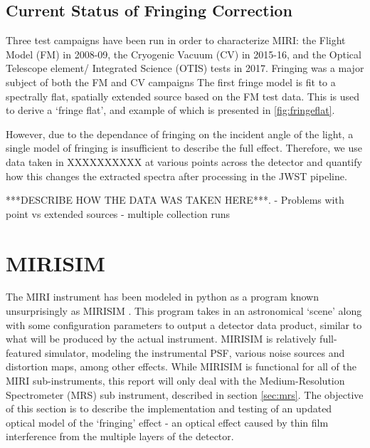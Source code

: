 \subsection{Current Status of Fringing Correction}
Three test campaigns have been run in order to characterize MIRI: the Flight Model (FM) in 2008-09, the Cryogenic Vacuum (CV) in 2015-16, and the Optical Telescope element/ Integrated Science (OTIS) tests in 2017. 
Fringing was a major subject of both the FM and CV campaigns
The first fringe model is fit to a spectrally flat, spatially extended source based on the FM test data.
This is used to derive a `fringe flat', and example of which is presented in \ref{fig:fringeflat}.


However, due to the dependance of fringing on the incident angle of the light, a single model of fringing is insufficient to describe the full effect. 
Therefore, we use data taken in XXXXXXXXXX at various points across the detector and quantify how this changes the extracted spectra after processing in the JWST pipeline.

***DESCRIBE HOW THE DATA WAS TAKEN HERE***.
- Problems with point vs extended sources
- multiple collection runs
\parencite{VanderPlas2018}

 \cite{Lahuis2018} %
\section{MIRISIM}

The MIRI instrument has been modeled in python as a program known unsurprisingly as MIRISIM \parencite{ref:mirisimdocs}. 
This program takes in an astronomical `scene' along with some configuration parameters to output a detector data product, similar to what will be produced by the actual instrument.
MIRISIM is relatively full-featured simulator, modeling the instrumental PSF, various noise sources and distortion maps, among other effects.
While MIRISIM is functional for all of the MIRI sub-instruments, this report will only deal with the Medium-Resolution Spectrometer (MRS) sub instrument, described in section \ref{sec:mrs}.
The objective of this section is to describe the implementation and testing of an updated optical model of the `fringing' effect - an optical effect caused by thin film interference from the multiple layers of the detector.
